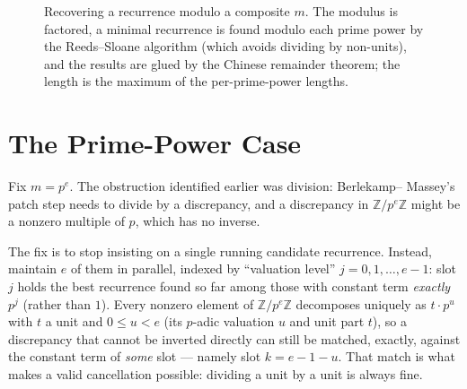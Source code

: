 \documentclass[11pt]{article}
\begin{document}
\begin{figure}[H]
\centering
{}
\caption{Recovering a recurrence modulo a composite $m$. The modulus is factored, a minimal recurrence is found modulo each prime power by the Reeds--Sloane algorithm (which avoids dividing by non-units), and the results are glued by the Chinese remainder theorem; the length is the maximum of the per-prime-power lengths.}\label{fig:rec_crt}
\end{figure}

\section{The Prime-Power Case}

Fix $m = p^e$. The obstruction identified earlier was division: Berlekamp--
Massey's patch step needs to divide by a discrepancy, and a discrepancy in
$\mathbb{Z}/p^e\mathbb{Z}$ might be a nonzero multiple of $p$, which has no
inverse.

The fix is to stop insisting on a single running candidate recurrence.
Instead, maintain $e$ of them in parallel, indexed by ``valuation level''
$j = 0, 1, \ldots, e-1$: slot $j$ holds the best recurrence found so far
among those with constant term \emph{exactly} $p^{j}$ (rather than $1$).
Every nonzero element of $\mathbb{Z}/p^e\mathbb{Z}$ decomposes uniquely as
$t \cdot p^{u}$ with $t$ a unit and $0 \le u < e$ (its $p$-adic valuation
$u$ and unit part $t$), so a discrepancy that cannot be inverted directly
can still be matched, exactly, against the constant term of \emph{some}
slot --- namely slot $k = e - 1 - u$. That match is what makes a valid
cancellation possible: dividing a unit by a unit is always fine.
\end{document}

